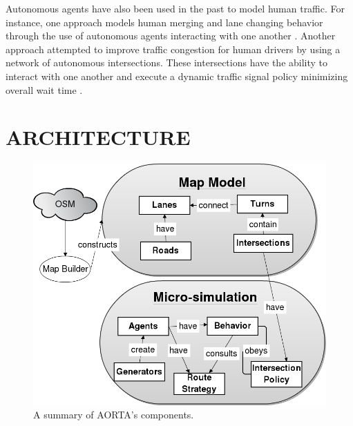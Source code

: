 \documentclass[letterpaper, 10 pt, conference]{ieeeconf}  %
\begin{document}

Autonomous agents have also been used in the past to model human traffic. For
instance, one approach models human merging and lane changing behavior through
the use of autonomous agents interacting with one another
\cite{hidas2002modelling}. Another approach attempted to improve traffic
congestion for human drivers by using a network of autonomous intersections.
These intersections have the ability to interact with one another and execute a
dynamic traffic signal policy minimizing overall wait time
\cite{manikonda2001autonomous}.


\section{ARCHITECTURE}
\label{sec:arch}

\begin{figure}
  \centering \includegraphics[scale=0.3]{architecture.png}
  \caption{A summary of AORTA's components.}
  \label{fig:arch}
  \vspace{-15pt}
\end{figure}
\end{document}
